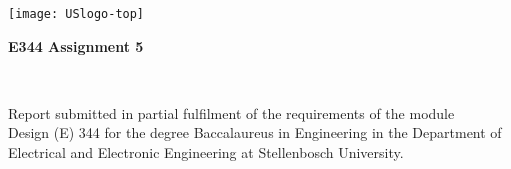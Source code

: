 \graphicspath{{frontmatter/fig/}}

\begin{titlepage}
\begin{center}

\texttt{[image: USlogo-top]}

\vfill

{\sffamily \bfseries \huge E344 Assignment 5 \par}

\vfill

{\large {\Large \nameFull} \\ \stNumber \par}

\vfill

\vfill

{Report submitted in partial fulfilment of the requirements of the module \\
Design (E) 344 for the degree Baccalaureus in Engineering in the Department of
Electrical and Electronic Engineering at Stellenbosch University. \par}

\vfill


\vfill

{\Large \myDate}
\end{center}
\end{titlepage}
